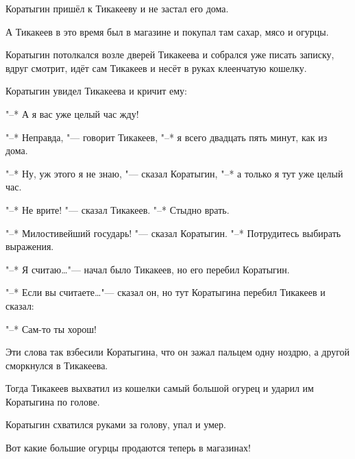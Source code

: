Коратыгин пришёл к Тикакееву и не застал его дома.

А Тикакеев в это время был в магазине и покупал там сахар, мясо и огурцы.

Коратыгин потолкался возле дверей Тикакеева и собрался уже писать записку, вдруг смотрит, идёт сам Тикакеев и несёт в руках клеенчатую кошелку.

Коратыгин увидел Тикакеева и кричит ему:

"--* А я вас уже целый час жду!

"--* Неправда, "--- говорит Тикакеев, "--* я всего двадцать пять минут, как из дома.

"--* Ну, уж этого я не знаю, "--- сказал Коратыгин, "--* а только я тут уже целый час.

"--* Не врите! "--- сказал Тикакеев. "--* Стыдно врать.

"--* Милостивейший государь! "--- сказал Коратыгин. "--* Потрудитесь выбирать выражения.

"--* Я считаю\dots "--- начал было Тикакеев, но его перебил Коратыгин.

"--* Если вы считаете\dots "--- сказал он, но тут Коратыгина перебил Тикакеев и сказал:

"--* Сам-то ты хорош!

Эти слова так взбесили Коратыгина, что он зажал пальцем одну ноздрю, а другой сморкнулся в Тикакеева.

Тогда Тикакеев выхватил из кошелки самый большой огурец и ударил им Коратыгина по голове.

Коратыгин схватился руками за голову, упал и умер.

Вот какие большие огурцы продаются теперь в магазинах!